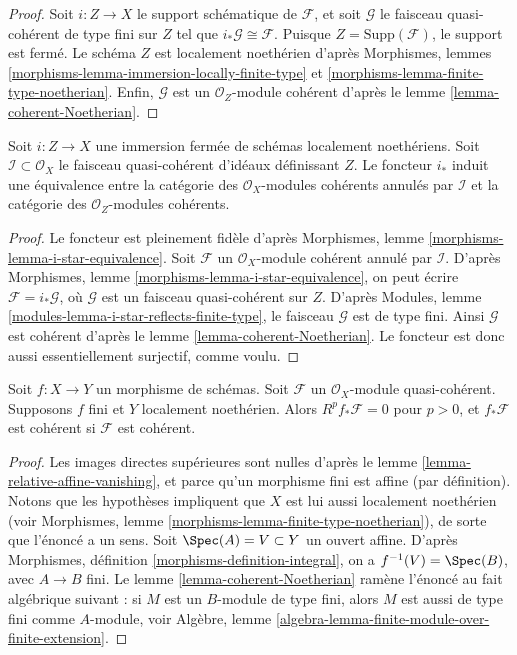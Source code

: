 \begin{proof}
Soit $i : Z \to X$ le support schématique de $\mathcal{F}$, et
soit $\mathcal{G}$ le faisceau quasi-cohérent de type fini sur $Z$
tel que $i_*\mathcal{G} \cong \mathcal{F}$.
Puisque $Z = \text{Supp}(\mathcal{F})$, le support est fermé.
Le schéma $Z$ est localement noethérien d'après
Morphismes, lemmes \ref{morphisms-lemma-immersion-locally-finite-type}
et \ref{morphisms-lemma-finite-type-noetherian}.
Enfin, $\mathcal{G}$ est un $\mathcal{O}_Z$-module cohérent d'après
le lemme \ref{lemma-coherent-Noetherian}.
\end{proof}

\begin{lemma}
\label{lemma-i-star-equivalence}
Soit $i : Z \to X$ une immersion fermée de schémas localement noethériens.
Soit $\mathcal{I} \subset \mathcal{O}_X$ le faisceau quasi-cohérent d'idéaux
définissant $Z$. Le foncteur $i_*$ induit une équivalence entre
la catégorie des $\mathcal{O}_X$-modules cohérents annulés par $\mathcal{I}$
et la catégorie des $\mathcal{O}_Z$-modules cohérents.
\end{lemma}

\begin{proof}
Le foncteur est pleinement fidèle d'après
Morphismes, lemme \ref{morphisms-lemma-i-star-equivalence}.
Soit $\mathcal{F}$ un $\mathcal{O}_X$-module
cohérent annulé par $\mathcal{I}$. D'après
Morphismes, lemme \ref{morphisms-lemma-i-star-equivalence},
on peut écrire $\mathcal{F} = i_*\mathcal{G}$,
où $\mathcal{G}$ est un faisceau quasi-cohérent sur $Z$. D'après
Modules, lemme \ref{modules-lemma-i-star-reflects-finite-type},
le faisceau $\mathcal{G}$ est de type fini.
Ainsi $\mathcal{G}$ est cohérent d'après le
lemme \ref{lemma-coherent-Noetherian}.
Le foncteur est donc aussi essentiellement surjectif, comme voulu.
\end{proof}

\begin{lemma}
\label{lemma-finite-pushforward-coherent}
Soit $f : X \to Y$ un morphisme de schémas.
Soit $\mathcal{F}$ un $\mathcal{O}_X$-module quasi-cohérent.
Supposons $f$ fini et $Y$ localement noethérien.
Alors $R^pf_*\mathcal{F} = 0$ pour $p > 0$, et
$f_*\mathcal{F}$ est cohérent si $\mathcal{F}$ est cohérent.
\end{lemma}

\begin{proof}
Les images directes supérieures sont nulles d'après le
lemme \ref{lemma-relative-affine-vanishing}, et
parce qu'un morphisme fini est affine (par
définition). Notons que les hypothèses impliquent que $X$ est lui aussi localement
noethérien (voir Morphismes, lemme \ref{morphisms-lemma-finite-type-noetherian}),
de sorte que l'énoncé a un sens.
Soit $\Spec(A) = V \subset Y$ un ouvert affine. D'après
Morphismes, définition \ref{morphisms-definition-integral},
on a $f^{-1}(V) = \Spec(B)$, avec $A \to B$ fini. Le
lemme \ref{lemma-coherent-Noetherian}
ramène l'énoncé au fait algébrique suivant :
si $M$ est un $B$-module de type fini, alors $M$ est aussi de
type fini comme $A$-module, voir
Algèbre, lemme \ref{algebra-lemma-finite-module-over-finite-extension}.
\end{proof}

